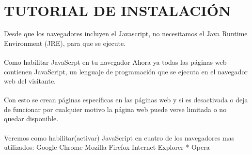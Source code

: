 \documentclass[11pt]{article} %
\begin{document}
\section{TUTORIAL DE INSTALACIÓN}
 Desde que los navegadores incluyen el Javascript, no necesitamos el Java Runtime Environment (JRE), para que se ejecute.
\\  \\
Como habilitar JavaScrpt en tu navegador 
Ahora ya todas las páginas web contienen  JavaScript, un lenguaje de programación que se ejecuta en el navegador web del visitante. \\\\
Con esto se crean páginas específicas en las páginas web y si es desactivada o deja de funcionar por cualquier motivo la página web puede verse limitada o no quedar disponible.
\\\\
Veremos como habilitar(activar) JavaScript en cuatro de los navegadores mas utilizados:
\newline
\newline* Google Chrome
\newline* Mozilla Firefox
\newline* Internet Explorer
\newline
* Opera
\newpage
\end{document}
